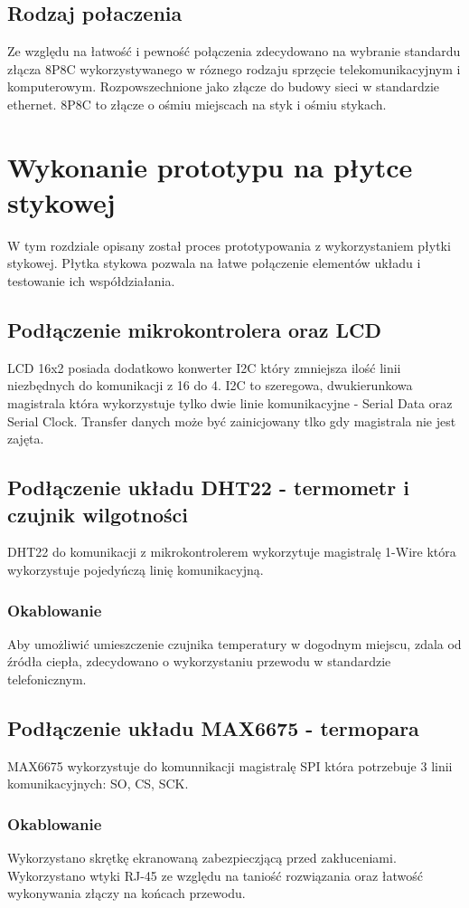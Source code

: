 \documentclass[12pt]{report}
\begin{document}
 \section{Rodzaj połaczenia}
 Ze względu na łatwość i pewność połączenia zdecydowano na wybranie standardu złącza 8P8C wykorzystywanego w róznego rodzaju sprzęcie telekomunikacyjnym i komputerowym. Rozpowszechnione jako złącze do budowy sieci w standardzie ethernet. 8P8C to złącze o ośmiu miejscach na styk i ośmiu stykach.
 
 
 \chapter{Wykonanie prototypu na płytce stykowej}
 W tym rozdziale opisany został proces prototypowania z wykorzystaniem płytki stykowej.
 Płytka stykowa pozwala na łatwe połączenie elementów układu i testowanie ich współdziałania.
 
 \section{Podłączenie mikrokontrolera oraz LCD}
 LCD 16x2 posiada dodatkowo konwerter I2C który zmniejsza ilość linii niezbędnych do komunikacji z 16 do 4.
 I2C to szeregowa, dwukierunkowa magistrala która wykorzystuje tylko dwie linie komunikacyjne - Serial Data oraz Serial Clock. Transfer danych może być zainicjowany tlko gdy magistrala nie jest zajęta.
  
 \section{Podłączenie układu DHT22 - termometr i czujnik wilgotności}
 DHT22 do komunikacji z mikrokontrolerem wykorzytuje magistralę 1-Wire która wykorzystuje pojedyńczą linię komunikacyjną. 
 \subsection{Okablowanie}
Aby umożliwić umieszczenie czujnika temperatury w dogodnym miejscu, zdala od źródła ciepła, zdecydowano o wykorzystaniu przewodu w standardzie telefonicznym.
 
 \section{Podłączenie układu MAX6675 - termopara}
 MAX6675 wykorzystuje do komunnikacji magistralę SPI która potrzebuje 3 linii komunikacyjnych: SO, CS, SCK.
 \subsection{Okablowanie}
 Wykorzystano skrętkę ekranowaną zabezpieczjącą przed zakłuceniami.
 Wykorzystano wtyki RJ-45 ze względu na taniość rozwiązania oraz łatwość wykonywania złączy na końcach przewodu.
 
\end{document}
